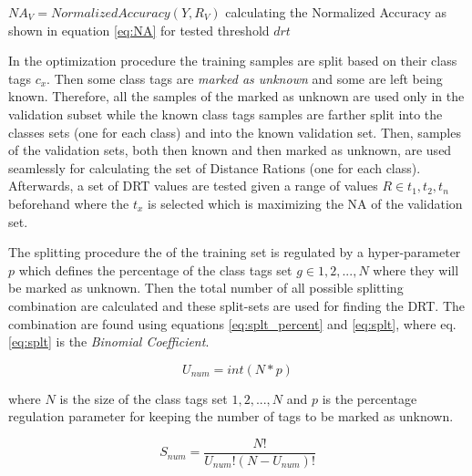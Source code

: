 \begin{algorithm}[H]
{{    }

    $NA_{V} = NormalizedAccuracy(Y, R_{V})$ calculating the Normalized Accuracy as shown in equation \ref{eq:NA} for tested threshold $drt$\;


}

\end{algorithm}

\hfill

In the optimization procedure the training samples are split based on their class tags $c_{x}$. Then some class tags are \textit{marked as unknown} and some are left being known. Therefore, all the samples of the marked as unknown are used only in the validation subset while the known class tags samples are farther split into the classes sets (one for each class) and into the known validation set. Then, samples of the validation sets, both then known and then marked as unknown, are used seamlessly for calculating the set of Distance Rations (one for each class). Afterwards, a set of DRT values are tested given a range of values $R \in {t_{1}, t_{2}, t_{n}}$ beforehand where the $t_{x}$ is selected which is maximizing the NA of the validation set.

The splitting procedure the of the training set is regulated by a hyper-parameter $p$ which defines the percentage of the class tags set $g \in {1,2,...,N}$ where they will be marked as unknown. Then the total number of all possible splitting combination are calculated and these split-sets are used for finding the DRT. The combination are found using equations \ref{eq:splt_percent} and \ref{eq:splt}, where eq.\ref{eq:splt} is the \textit{Binomial Coefficient}.

\begin{equation} \label{eq:splt_percent}
    U_{num} = int(N * p)
\end{equation}

\noindent
where $N$ is the size of the class tags set ${1,2,...,N}$ and $p$ is the percentage regulation parameter for keeping the number of tags to be marked as unknown.

\begin{equation} \label{eq:splt}
    S_{num} = \frac{N!}{U_{num}!(N-U_{num})!}
\end{equation}

